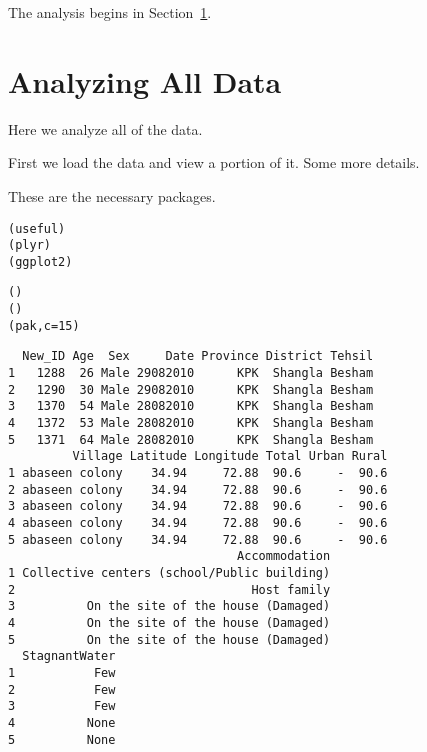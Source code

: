 \documentclass{article}\usepackage{knitr}
\begin{document}
The analysis begins in Section~\ref{sec:overall}.



\section{Analyzing All Data}
\label{sec:overall}
Here we analyze all of the data.

First we load the data and view a portion of it. Some more details.

These are the necessary packages.
\begin{knitrout}
\color{fgcolor}\begin{kframe}
\begin{alltt}
(useful)
(plyr)
(ggplot2)
\end{alltt}
\end{kframe}
\end{knitrout}


\begin{knitrout}
\color{fgcolor}\begin{kframe}
\begin{alltt}
()
()
(pak, c = 15)
\end{alltt}
\begin{verbatim}
  New_ID Age  Sex     Date Province District Tehsil
1   1288  26 Male 29082010      KPK  Shangla Besham
2   1290  30 Male 29082010      KPK  Shangla Besham
3   1370  54 Male 28082010      KPK  Shangla Besham
4   1372  53 Male 28082010      KPK  Shangla Besham
5   1371  64 Male 28082010      KPK  Shangla Besham
         Village Latitude Longitude Total Urban Rural
1 abaseen colony    34.94     72.88  90.6     -  90.6
2 abaseen colony    34.94     72.88  90.6     -  90.6
3 abaseen colony    34.94     72.88  90.6     -  90.6
4 abaseen colony    34.94     72.88  90.6     -  90.6
5 abaseen colony    34.94     72.88  90.6     -  90.6
                                Accommodation
1 Collective centers (school/Public building)
2                                 Host family
3          On the site of the house (Damaged)
4          On the site of the house (Damaged)
5          On the site of the house (Damaged)
  StagnantWater
1           Few
2           Few
3           Few
4          None
5          None
\end{verbatim}
\end{kframe}
\end{knitrout}
\end{document}
